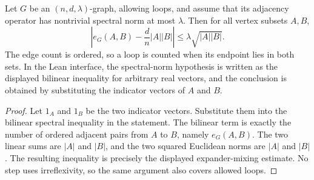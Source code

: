 \begin{lemma}
Let $G$ be an $(n,d,\lambda)$-graph, allowing loops, and assume that its
adjacency operator has nontrivial spectral norm at most $\lambda$.  Then for
all vertex subsets $A,B$,
\[
 \left|e_G(A,B)-\frac d n|A||B|\right|
 \leq \lambda\sqrt{|A||B|}.
\]
The edge count is ordered, so a loop is counted when its endpoint lies in
both sets.  In the Lean interface, the spectral-norm hypothesis is written
as the displayed bilinear inequality for arbitrary real vectors, and the
conclusion is obtained by substituting the indicator vectors of $A$ and
$B$.
\end{lemma}
\begin{proof}
Let $1_A$ and $1_B$ be the two indicator vectors.  Substitute them into the
bilinear spectral inequality in the statement.  The bilinear term is exactly
the number of ordered adjacent pairs from $A$ to $B$, namely $e_G(A,B)$.
The two linear sums are $|A|$ and $|B|$, and the two squared Euclidean norms
are $|A|$ and $|B|$.  The resulting inequality is precisely the displayed
expander-mixing estimate.  No step uses irreflexivity, so the same argument
also covers allowed loops.
\end{proof}
